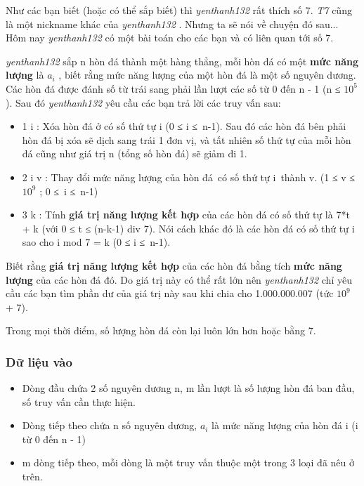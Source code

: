 



   Như các bạn biết (hoặc có thể sắp biết) thì   \emph{    yenthanh132   }   rất thích số 7.   \emph{    T7   }   cũng là một nickname khác của   \emph{    yenthanh132   }   . Nhưng ta sẽ nói về chuyện đó sau... Hôm nay   \emph{    yenthanh132   }   có một bài toán cho các bạn và có liên quan tới số 7.  

\emph{    yenthanh132   }   sắp n hòn đá thành một hàng thẳng, mỗi hòn đá có một   \textbf{    mức năng lượng   }   là $a_{i}$   , biết rằng mức năng lượng của một hòn đá là một số nguyên dương. Các hòn đá được đánh số từ trái sang phải lần lượt các số từ 0 đến n - 1 (n ≤ $10^{5}$   ). Sau đó   \emph{    yenthanh132   }   yêu cầu các bạn trả lời các truy vấn sau:  
\begin{itemize}
	\item     1 i : Xóa hòn đá ở có số thứ tự i (0 ≤ i ≤ n-1). Sau đó các hòn đá bên phải hòn đá bị xóa sẽ dịch sang trái 1 đơn vị, và tất nhiên số thứ tự của mỗi hòn đá cũng như giá trị n (tổng số hòn đá) sẽ giảm đi 1.   
	\item     2 i v : Thay đổi mức năng lượng của hòn đá có số thứ tự i thành v. (1 ≤ v ≤ $10^{9}$    ; 0 ≤ i ≤ n-1)   
	\item     3 k : Tính    \textbf{     giá trị năng lượng kết hợp    }    của các hòn đá có số thứ tự là 7*t + k (với 0 ≤ t ≤ (n-k-1) div 7). Nói cách khác đó là các hòn đá có số thứ tự i sao cho i mod 7 = k (0 ≤ i ≤ n-1).   
\end{itemize}

   Biết rằng   \textbf{    giá trị năng lượng kết hợp   }   của các hòn đá bằng tích   \textbf{    mức năng lượng   }   của các hòn đá đó. Do giá trị này có thể rất lớn nên   \emph{    yenthanh132   }   chỉ yêu cầu các bạn tìm phần dư của giá trị này sau khi chia cho 1.000.000.007 (tức $10^{9}$   + 7).  

   Trong mọi thời điểm, số lượng hòn đá còn lại luôn lớn hơn hoặc bằng 7.  

\subsubsection{   Dữ liệu vào  }
\begin{itemize}
	\item     Dòng đầu chứa 2 số nguyên dương n, m lần lượt là số lượng hòn đá ban đầu, số truy vấn cần thực hiện.   
	\item     Dòng tiếp theo chứa n số nguyên dương, $a_{i}$    là mức năng lượng của hòn đá i (i từ 0 đến n - 1)   
	\item     m dòng tiếp theo, mỗi dòng là một truy vấn thuộc một trong 3 loại đã nêu ở trên.   
\end{itemize}

